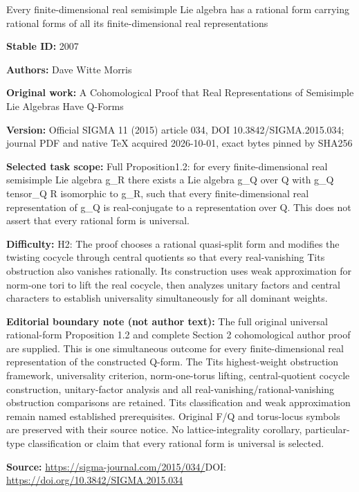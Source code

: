 \documentclass[11pt]{article}
\numberwithin{equation}{section}
\begin{document}
\begin{center}\Large Every finite-dimensional real semisimple Lie algebra has a rational form carrying rational forms of all its finite-dimensional real representations\end{center}
\noindent\textbf{Stable ID:} 2007\par
\noindent\textbf{Authors:} Dave Witte Morris\par
\noindent\textbf{Original work:} A Cohomological Proof that Real Representations of Semisimple Lie Algebras Have Q-Forms\par
\noindent\textbf{Version:} Official SIGMA 11 (2015) article 034, DOI 10.3842/SIGMA.2015.034; journal PDF and native TeX acquired 2026-10-01, exact bytes pinned by SHA256\par
\noindent\textbf{Selected task scope:} Full Proposition1.2: for every finite-dimensional real semisimple Lie algebra g\_R there exists a Lie algebra g\_Q over Q with g\_Q tensor\_Q R isomorphic to g\_R, such that every finite-dimensional real representation of g\_Q is real-conjugate to a representation over Q. This does not assert that every rational form is universal.\par
\noindent\textbf{Difficulty:} H2: The proof chooses a rational quasi-split form and modifies the twisting cocycle through central quotients so that every real-vanishing Tits obstruction also vanishes rationally. Its construction uses weak approximation for norm-one tori to lift the real cocycle, then analyzes unitary factors and central characters to establish universality simultaneously for all dominant weights.\par
\noindent\textbf{Editorial boundary note (not author text):} The full original universal rational-form Proposition 1.2 and complete Section 2 cohomological author proof are supplied. This is one simultaneous outcome for every finite-dimensional real representation of the constructed Q-form. The Tits highest-weight obstruction framework, universality criterion, norm-one-torus lifting, central-quotient cocycle construction, unitary-factor analysis and all real-vanishing/rational-vanishing obstruction comparisons are retained. Tits classification and weak approximation remain named established prerequisites. Original F/Q and torus-locus symbols are preserved with their source notice. No lattice-integrality corollary, particular-type classification or claim that every rational form is universal is selected.\par
\noindent\textbf{Source:} \url{https://sigma-journal.com/2015/034/}\quad DOI: \url{https://doi.org/10.3842/SIGMA.2015.034}\par
\end{document}
